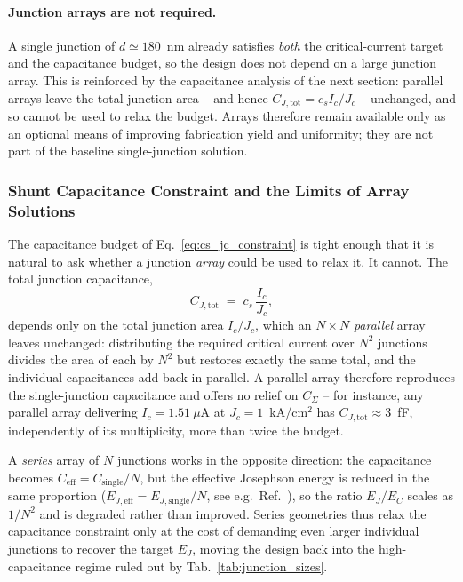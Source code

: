 \paragraph{Junction arrays are not required.}
A single junction of $d\simeq 180$~nm already satisfies \emph{both} the critical-current target and the capacitance budget, so the design does not depend on a large junction array. This is reinforced by the capacitance analysis of the next section: parallel arrays leave the total junction area -- and hence $C_{J,\text{tot}}=c_s I_c/J_c$ -- unchanged, and so cannot be used to relax the budget. Arrays therefore remain available only as an optional means of improving fabrication yield and uniformity; they are not part of the baseline single-junction solution.

\subsubsection{Shunt Capacitance Constraint and the Limits of Array Solutions}
\label{sec:shunt_cap_array}

The capacitance budget of Eq.~\eqref{eq:cs_jc_constraint} is tight enough that
it is natural to ask whether a junction \emph{array} could be used to relax it.
It cannot. The total junction capacitance,
\begin{equation}
C_{J,\text{tot}} \;=\; c_s\,\frac{I_c}{J_c},
\label{eq:CJ_parallel}
\end{equation}
depends only on the total junction area $I_c/J_c$, which an $N\times N$
\emph{parallel} array leaves unchanged: distributing the required critical
current over $N^{2}$ junctions divides the area of each by $N^{2}$ but restores
exactly the same total, and the individual capacitances add back in parallel.
A parallel array therefore reproduces the single-junction capacitance and
offers no relief on $C_{\Sigma}$ -- for instance, any parallel array delivering
$I_c=1.51~\mu$A at $J_c=1$~kA/cm$^2$ has $C_{J,\text{tot}}\approx 3$~fF,
independently of its multiplicity, more than twice the budget.

A \emph{series} array of $N$ junctions works in the opposite direction:
the capacitance becomes $C_{\text{eff}}=C_{\text{single}}/N$, but the
effective Josephson energy is reduced in the same proportion
($E_{J,\text{eff}}=E_{J,\text{single}}/N$, see e.g.\
Ref.~\cite{manucharyan2009fluxonium}),
so the ratio $E_J/E_C$ scales as $1/N^{2}$ and is degraded rather than improved.
Series geometries thus relax the capacitance constraint only at the cost of
demanding even larger individual junctions to recover the target $E_J$,
moving the design back into the high-capacitance regime ruled out by
Tab.~\ref{tab:junction_sizes}.

